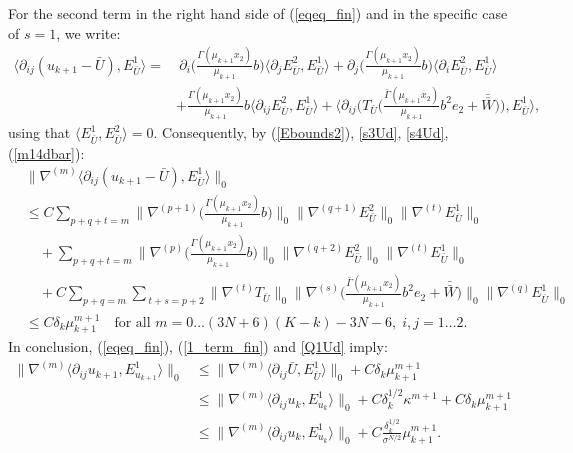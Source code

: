 \documentclass[reqno,twoside,11pt]{amsart}
\newcommand*{\dbar}[1]{\bar{\bar{#1}}}
\numberwithin{equation}{section}
\theoremstyle{plain}
\theoremstyle{definition}
\begin{document}
For the second term in the right hand side of (\ref{eqeq_fin}) and in the
specific case of $s=1$, we write: 
\begin{equation*}
\begin{split}
\langle\partial_{ij}(u_{k+1}-\bar U), E^1_{\bar U} \rangle = & ~\partial_i
\Big(\frac{\Gamma(\mu_{k+1}x_2)}{\mu_{k+1}}
b\Big)\langle \partial_jE^2_{\bar U},
E^1_{\bar U}\rangle + \partial_j\Big(\frac{\Gamma(\mu_{k+1}
  x_2)}{\mu_{k+1}} b\Big)\langle \partial_iE^2_{\bar U},
E^1_{\bar U}\rangle \\ & + \frac{\Gamma(\mu_{k+1}x_2)}{\mu_{k+1}} b
\langle \partial_{ij}E^2_{\bar U},
E^1_{\bar U}\rangle + \Big\langle \partial_{ij}\Big(T_{\bar U}\Big(\frac{\bar\Gamma(\mu_{k+1}
 x_2)}{\mu_{k+1}}b^2e_2+\dbar W\Big)\Big), E^1_{\bar U}\Big\rangle,
\end{split}
\end{equation*}
using that $\langle E^1_{\bar U}, E^2_{\bar U}\rangle=0$. 
Consequently, by (\ref{Ebounds2}), \ref{s3Ud}, \ref{s4Ud}, (\ref{m14dbar}):
\begin{equation}\label{kalb0}
\begin{split}
& \|\nabla^{(m)}\langle\partial_{ij}(u_{k+1} - \bar U), E^1_{\bar U}\rangle\|_0 
\\ & \leq  C\sum_{p+q+t=m}\big\|\nabla^{(p+1)}\Big (\frac{\Gamma(\mu_{k+1}
  x_2)}{\mu_{k+1}} b\Big)\big\|_0 \|\nabla^{(q+1)}E^2_{\bar U}\|_0\|\nabla^{(t)}E^1_{\bar U}\|_0
\\ & \quad +\sum_{p+q+t= m} \big\|\nabla^{(p)}\Big (\frac{\Gamma(\mu_{k+1}
  x_2)}{\mu_{k+1}} b\Big)\big\|_0 \|\nabla^{(q+2)}E^2_{\bar  U}\|_0\|\nabla^{(t)}E^1_{\bar U}\|_0
\\ & \quad + C\sum_{p+q=m}\sum_{~t+s=p+2}\|\nabla^{(t)}T_{\bar U}\|_0
\big\|\nabla^{(s)}\Big (\frac{\bar\Gamma(\mu_{k+1} x_2)}{\mu_{k+1}} b^2e_2 +
\dbar W\Big)\big\|_0\|\nabla^{(q)}E^1_{\bar U}\|_0
\\ & \leq  C\delta_k\mu_{k+1}^{m+1} 
\quad\mbox{for all } m=0\ldots (3N+6)(K-k)-3N-6, \; i,j=1\ldots 2.
\end{split}
\end{equation}
In conclusion, (\ref{eqeq_fin}), (\ref{1_term_fin}) and \ref{Q1Ud} imply:
\begin{equation}\label{21_ter_fin}
\begin{split}
\|\nabla^{(m)}\langle \partial_{ij} u_{k+1}, E^1_{u_{k+1}}\rangle \|_0
&  \leq \|\nabla^{(m)}\langle \partial_{ij} \bar U, E^1_{\bar U}\rangle\|_0+
C\delta_k\mu_{k+1}^{m+1} \\ & \leq  
\|\nabla^{(m)}\langle \partial_{ij} u_k, E^1_{u_k}\rangle\|_0+
C \delta_k^{1/2}\kappa^{m+1}+C\delta_k\mu_{k+1}^{m+1} 
\\ & \leq \|\nabla^{(m)}\langle \partial_{ij} u_k, E^1_{u_k}\rangle\|_0 +
C \frac{\delta_k^{1/2}}{\sigma^{N/2}}\mu_{k+1}^{m+1}.
\end{split}
\end{equation}
\end{document}
